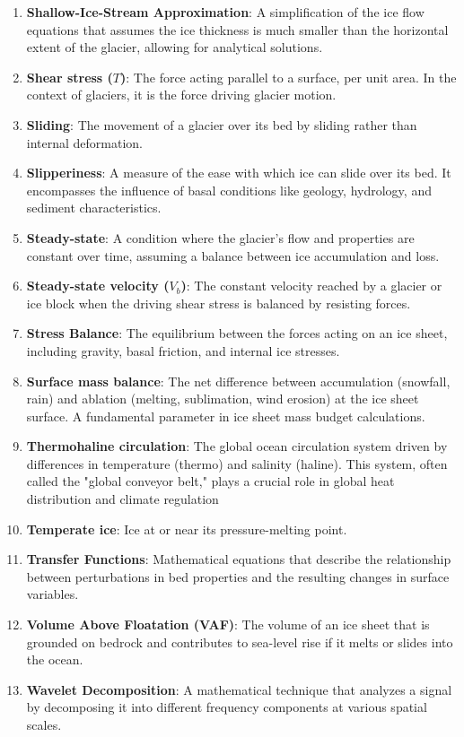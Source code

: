 \begin{enumerate}
\item \textbf{Shallow-Ice-Stream Approximation}: A simplification of the ice flow equations that assumes the ice thickness is much smaller than the horizontal extent of the glacier, allowing for analytical solutions.
\item \textbf{Shear stress ($T$)}: The force acting parallel to a surface, per unit area. In the context of glaciers, it is the force driving glacier motion.
\item \textbf{Sliding}: The movement of a glacier over its bed by sliding rather than internal deformation.
\item \textbf{Slipperiness}: A measure of the ease with which ice can slide over its bed. It encompasses the influence of basal conditions like geology, hydrology, and sediment characteristics.
\item \textbf{Steady-state}: A condition where the glacier's flow and properties are constant over time, assuming a balance between ice accumulation and loss.
\item \textbf{Steady-state velocity ($V_b$)}: The constant velocity reached by a glacier or ice block when the driving shear stress is balanced by resisting forces.
\item \textbf{Stress Balance}: The equilibrium between the forces acting on an ice sheet, including gravity, basal friction, and internal ice stresses.
\item \textbf{Surface mass balance}: The net difference between accumulation (snowfall, rain) and ablation (melting, sublimation, wind erosion) at the ice sheet surface. A fundamental parameter in ice sheet mass budget calculations.
\item \textbf{Thermohaline circulation}: The global ocean circulation system driven by differences in temperature (thermo) and salinity (haline). This system, often called the "global conveyor belt," plays a crucial role in global heat distribution and climate regulation
\item \textbf{Temperate ice}: Ice at or near its pressure-melting point.
\item \textbf{Transfer Functions}: Mathematical equations that describe the relationship between perturbations in bed properties and the resulting changes in surface variables.
\item \textbf{Volume Above Floatation (VAF)}: The volume of an ice sheet that is grounded on bedrock and contributes to sea-level rise if it melts or slides into the ocean.
\item \textbf{Wavelet Decomposition}: A mathematical technique that analyzes a signal by decomposing it into different frequency components at various spatial scales.
\end{enumerate}